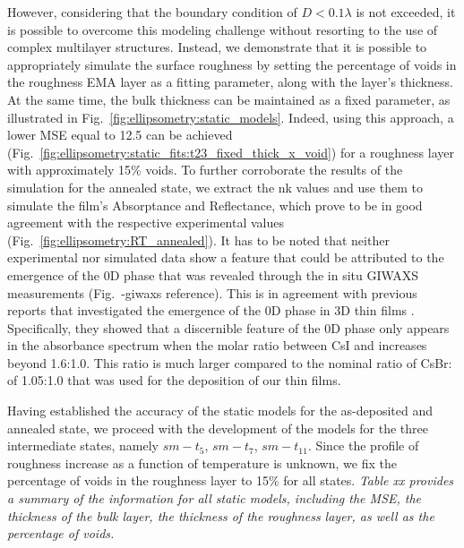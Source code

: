 However, considering that the boundary condition of $D<0.1\lambda$ is not exceeded, it is possible to overcome this modeling challenge without resorting to the use of complex multilayer structures. Instead, we demonstrate that it is possible to appropriately simulate the surface roughness by setting the percentage of voids in the roughness EMA layer as a fitting parameter, along with the layer's thickness. At the same time, the bulk thickness can be maintained as a fixed parameter, as illustrated in Fig.~\ref{fig:ellipsometry:static_models}. Indeed, using this approach, a lower MSE equal to 12.5 can be achieved (Fig.~\ref{fig:ellipsometry:static_fits:t23_fixed_thick_x_void}) for a roughness layer with approximately 15\% voids. To further corroborate the results of the simulation for the annealed state, we extract the nk values and use them to simulate the film's Absorptance and Reflectance, which prove to be in good agreement with the respective experimental values (Fig.~\ref{fig:ellipsometry:RT_annealed}). It has to be noted that neither experimental nor simulated data show a feature that could be attributed to the emergence of the 0D  phase that was revealed through the in situ GIWAXS measurements (Fig.~-giwaxs reference). This is in agreement with previous reports that investigated the emergence of the 0D  phase in 3D  thin films \cite{Bai2019AStability}. Specifically, they showed that a discernible feature of the 0D phase only appears in the absorbance spectrum when the molar ratio between CsI and  increases beyond 1.6:1.0. This ratio is much larger compared to the nominal ratio of CsBr: of 1.05:1.0 that was used for the deposition of our thin films. 

Having established the accuracy of the static models for the as-deposited and annealed state, we proceed with the development of the models for the three intermediate states, namely $sm-t_5$, $sm-t_7$, $sm-t_{\text{11}}$. Since the profile of roughness increase as a function of temperature is unknown, we fix the percentage of voids in the roughness layer to 15\% for all states. \textit{Table xx provides a summary of the information for all static models, including the MSE, the thickness of the bulk layer, the thickness of the roughness layer, as well as the percentage of voids.}


